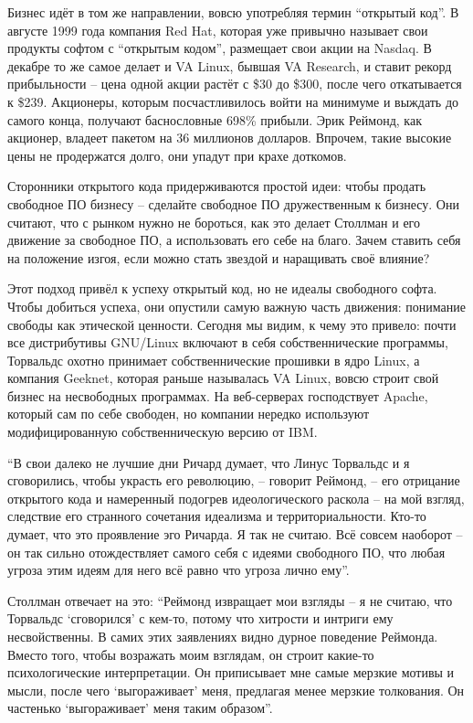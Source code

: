 Бизнес идёт в том же направлении, вовсю употребляя термин \enquote{открытый код}. В августе 1999 года компания Red Hat, которая уже привычно называет свои продукты софтом с \enquote{открытым кодом}, размещает свои акции на Nasdaq. В декабре то же самое делает и VA Linux, бывшая VA Research, и ставит рекорд прибыльности -- цена одной акции растёт с \$30 до \$300, после чего откатывается к \$239. Акционеры, которым посчастливилось войти на минимуме и выждать до самого конца, получают баснословные 698\% прибыли. Эрик Реймонд, как акционер, владеет пакетом на 36 миллионов долларов. Впрочем, такие высокие цены не продержатся долго, они упадут при крахе доткомов.

Сторонники открытого кода придерживаются простой идеи: чтобы продать свободное ПО бизнесу -- сделайте свободное ПО дружественным к бизнесу. Они считают, что с рынком нужно не бороться, как это делает Столлман и его движение за свободное ПО, а использовать его себе на благо. Зачем ставить себя на положение изгоя, если можно стать звездой и наращивать своё влияние?

Этот подход привёл к успеху открытый код, но не идеалы свободного софта. Чтобы добиться успеха, они опустили самую важную часть движения: понимание свободы как этической ценности. Сегодня мы видим, к чему это привело: почти все дистрибутивы GNU/Linux включают в себя собственнические программы, Торвальдс охотно принимает собственнические прошивки в ядро Linux, а компания Geeknet, которая раньше называлась VA Linux, вовсю строит свой бизнес на несвободных программах. На веб-серверах господствует Apache, который сам по себе свободен, но компании нередко используют модифицированную собственническую версию от IBM.

\enquote{В свои далеко не лучшие дни Ричард думает, что Линус Торвальдс и я сговорились, чтобы украсть его революцию, -- говорит Реймонд, -- его отрицание открытого кода и намеренный подогрев идеологического раскола -- на мой взгляд, следствие его странного сочетания идеализма и территориальности. Кто-то думает, что это проявление эго Ричарда. Я так не считаю. Всё совсем наоборот -- он так сильно отождествляет самого себя с идеями свободного ПО, что любая угроза этим идеям для него всё равно что угроза лично ему}.

Столлман отвечает на это: \enquote{Реймонд извращает мои взгляды -- я не считаю, что Торвальдс \enquote{сговорился} с кем-то, потому что хитрости и интриги ему несвойственны. В самих этих заявлениях видно дурное поведение Реймонда. Вместо того, чтобы возражать моим взглядам, он строит какие-то психологические интерпретации. Он приписывает мне самые мерзкие мотивы и мысли, после чего \enquote{выгораживает} меня, предлагая менее мерзкие толкования. Он частенько \enquote{выгораживает} меня таким образом}.


